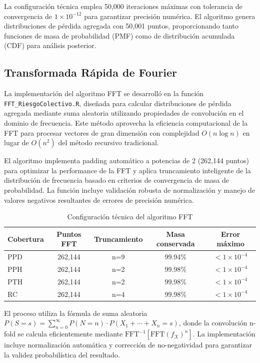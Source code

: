 La configuración técnica emplea 50,000 iteraciones máximas con tolerancia de convergencia de $1 \times 10^{-12}$ para garantizar precisión numérica. El algoritmo genera distribuciones de pérdida agregada con 50,001 puntos, proporcionando tanto funciones de masa de probabilidad (PMF) como de distribución acumulada (CDF) para análisis posterior.

\subsection{Transformada Rápida de Fourier}

La implementación del algoritmo FFT se desarrolló en la función \texttt{FFT\_RiesgoColectivo.R}, diseñada para calcular distribuciones de pérdida agregada mediante suma aleatoria utilizando propiedades de convolución en el dominio de frecuencia. Este método aprovecha la eficiencia computacional de la FFT para procesar vectores de gran dimensión con complejidad $O(n \log n)$ en lugar de $O(n^2)$ del método recursivo tradicional.

El algoritmo implementa padding automático a potencias de 2 (262,144 puntos) para optimizar la performance de la FFT y aplica truncamiento inteligente de la distribución de frecuencia basado en criterios de convergencia de masa de probabilidad. La función incluye validación robusta de normalización y manejo de valores negativos resultantes de errores de precisión numérica.

\begin{table}[H]
\centering
\caption{Configuración técnica del algoritmo FFT}
\begin{tabular}{lcccc}
\hline
\textbf{Cobertura} & \textbf{Puntos FFT} & \textbf{Truncamiento} & \textbf{Masa conservada} & \textbf{Error máximo} \\
\hline
PPD & 262,144 & n=9 & 99.94\% & $<1 \times 10^{-4}$ \\
PPH & 262,144 & n=2 & 99.98\% & $<1 \times 10^{-4}$ \\
PTH & 262,144 & n=2 & 99.98\% & $<1 \times 10^{-4}$ \\
RC & 262,144 & n=4 & 99.98\% & $<1 \times 10^{-4}$ \\
\hline
\end{tabular}
\end{table}

El proceso utiliza la fórmula de suma aleatoria $P(S = s) = \sum_{n=0}^{\infty} P(N = n) \cdot P(X_1 + \cdots + X_n = s)$, donde la convolución n-fold se calcula eficientemente mediante $\text{FFT}^{-1}[\text{FFT}(f_X)^n]$. La implementación incluye normalización automática y corrección de no-negatividad para garantizar la validez probabilística del resultado.


